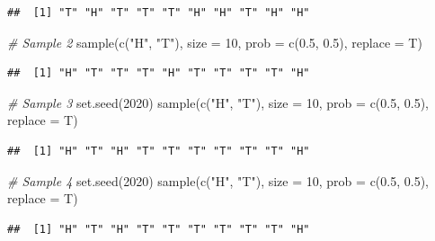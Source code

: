 \documentclass[
  11pt,
]{book}
\newenvironment{Shaded}{\begin{snugshade}}{\end{snugshade}}
\newcommand{\AttributeTok}[1]{\textcolor[rgb]{0.77,0.63,0.00}{#1}}
\newcommand{\CommentTok}[1]{\textcolor[rgb]{0.56,0.35,0.01}{\textit{#1}}}
\newcommand{\DecValTok}[1]{\textcolor[rgb]{0.00,0.00,0.81}{#1}}
\newcommand{\FloatTok}[1]{\textcolor[rgb]{0.00,0.00,0.81}{#1}}
\newcommand{\FunctionTok}[1]{\textcolor[rgb]{0.00,0.00,0.00}{#1}}
\newcommand{\NormalTok}[1]{#1}
\newcommand{\StringTok}[1]{\textcolor[rgb]{0.31,0.60,0.02}{#1}}
\theoremstyle{definition}
\theoremstyle{definition}
\theoremstyle{definition}
\theoremstyle{definition}
\theoremstyle{remark}
\begin{document}
\begin{verbatim}
##  [1] "T" "H" "T" "T" "T" "H" "H" "T" "H" "H"
\end{verbatim}

\begin{Shaded}
\begin{Highlighting}[]
\CommentTok{\# Sample 2}
\FunctionTok{sample}\NormalTok{(}\FunctionTok{c}\NormalTok{(}\StringTok{"H"}\NormalTok{, }\StringTok{"T"}\NormalTok{), }\AttributeTok{size =} \DecValTok{10}\NormalTok{, }\AttributeTok{prob =} \FunctionTok{c}\NormalTok{(}\FloatTok{0.5}\NormalTok{, }\FloatTok{0.5}\NormalTok{), }\AttributeTok{replace =}\NormalTok{ T)}
\end{Highlighting}
\end{Shaded}

\begin{verbatim}
##  [1] "H" "T" "T" "T" "H" "T" "T" "T" "T" "H"
\end{verbatim}

\begin{Shaded}
\begin{Highlighting}[]
\CommentTok{\# Sample 3}
\FunctionTok{set.seed}\NormalTok{(}\DecValTok{2020}\NormalTok{)}
\FunctionTok{sample}\NormalTok{(}\FunctionTok{c}\NormalTok{(}\StringTok{"H"}\NormalTok{, }\StringTok{"T"}\NormalTok{), }\AttributeTok{size =} \DecValTok{10}\NormalTok{, }\AttributeTok{prob =} \FunctionTok{c}\NormalTok{(}\FloatTok{0.5}\NormalTok{, }\FloatTok{0.5}\NormalTok{), }\AttributeTok{replace =}\NormalTok{ T)}
\end{Highlighting}
\end{Shaded}

\begin{verbatim}
##  [1] "H" "T" "H" "T" "T" "T" "T" "T" "T" "H"
\end{verbatim}

\begin{Shaded}
\begin{Highlighting}[]
\CommentTok{\# Sample 4}
\FunctionTok{set.seed}\NormalTok{(}\DecValTok{2020}\NormalTok{)}
\FunctionTok{sample}\NormalTok{(}\FunctionTok{c}\NormalTok{(}\StringTok{"H"}\NormalTok{, }\StringTok{"T"}\NormalTok{), }\AttributeTok{size =} \DecValTok{10}\NormalTok{, }\AttributeTok{prob =} \FunctionTok{c}\NormalTok{(}\FloatTok{0.5}\NormalTok{, }\FloatTok{0.5}\NormalTok{), }\AttributeTok{replace =}\NormalTok{ T)}
\end{Highlighting}
\end{Shaded}

\begin{verbatim}
##  [1] "H" "T" "H" "T" "T" "T" "T" "T" "T" "H"
\end{verbatim}
\end{document}

